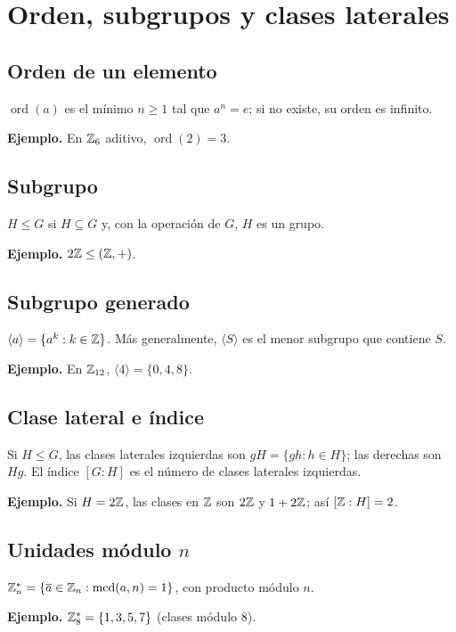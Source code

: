 \documentclass[11pt,a4paper]{article}
\newcommand{\ord}{\operatorname{ord}}\newcommand{\gen}[1]{\langle #1\rangle}
\begin{document}
\section{Orden, subgrupos y clases laterales}

\subsection{Orden de un elemento}
\begin{definicion}
$\ord(a)$ es el mínimo $n\ge1$ tal que $a^n=e$; si no existe, su orden es infinito.
\end{definicion}
\textbf{Ejemplo.} En $\mathbb{Z}_6$ aditivo, $\ord(2)=3$.


\subsection{Subgrupo}
\begin{definicion}
$H\le G$ si $H\subseteq G$ y, con la operación de $G$, $H$ es un grupo.
\end{definicion}
\textbf{Ejemplo.} $2\mathbb{Z}\le(\mathbb{Z},+)$.


\subsection{Subgrupo generado}
\begin{definicion}
$\gen a=\{a^k:k\in\Z\}$. Más generalmente, $\gen S$ es el menor subgrupo que contiene $S$.
\end{definicion}
\textbf{Ejemplo.} En $\mathbb{Z}_{12}$, $\gen{4}=\{0,4,8\}$.


\subsection{Clase lateral e índice}
\begin{definicion}
Si $H\le G$, las clases laterales izquierdas son $gH=\{gh:h\in H\}$; las derechas son $Hg$. El índice $[G:H]$ es el número de clases laterales izquierdas.
\end{definicion}
\textbf{Ejemplo.} Si $H=2\mathbb{Z}$, las clases en $\mathbb{Z}$ son $2\mathbb{Z}$ y $1+2\mathbb{Z}$; así $[\mathbb{Z}:H]=2$.


\subsection{Unidades módulo $n$}
\begin{definicion}
$\mathbb{Z}_n^*=\{\overline a\in\mathbb{Z}_n:\operatorname{mcd}(a,n)=1\}$, con producto módulo $n$.
\end{definicion}
\textbf{Ejemplo.} $\mathbb{Z}_8^*=\{1,3,5,7\}$ (clases módulo $8$).
\end{document}
